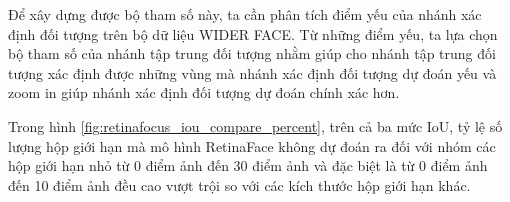 {    \noindent
    Để xây dựng được bộ tham số này, ta cần phân tích điểm yếu của nhánh xác định đối tượng trên bộ dữ liệu WIDER FACE.
    Từ những điểm yếu, ta lựa chọn bộ tham số của nhánh tập trung đối tượng nhằm giúp cho nhánh tập trung đối tượng xác định được những vùng mà nhánh xác định đối tượng dự đoán yếu và zoom in giúp nhánh xác định đối tượng dự đoán chính xác hơn.

    \noindent
    Trong hình \ref{fig:retinafocus_iou_compare_percent}, trên cả ba mức IoU, tỷ lệ số lượng hộp giới hạn mà mô hình RetinaFace không dự đoán ra đối với nhóm các hộp giới hạn nhỏ từ 0 điểm ảnh đến 30 điểm ảnh và đặc biệt là từ 0 điểm ảnh đến 10 điểm ảnh đều cao vượt trội so với các kích thước hộp giới hạn khác.

}
